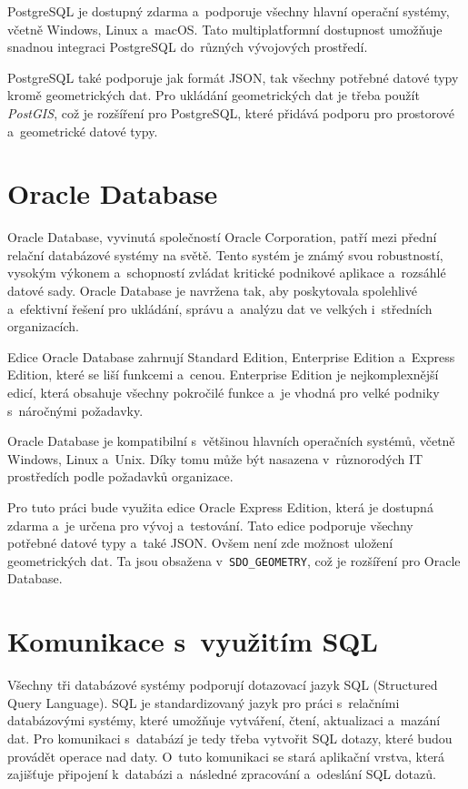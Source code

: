 PostgreSQL je dostupný zdarma a~podporuje všechny hlavní operační systémy, včetně Windows, Linux a~macOS.
Tato multiplatformní dostupnost umožňuje snadnou integraci PostgreSQL do~různých vývojových prostředí.
\cite{postgresql}

PostgreSQL také podporuje jak formát JSON, tak všechny potřebné datové typy kromě geometrických dat.
Pro ukládání geometrických dat je třeba použít \textit{PostGIS}, což je rozšíření pro PostgreSQL, které přidává
podporu pro prostorové a~geometrické datové typy.

\section{Oracle Database}
Oracle Database, vyvinutá společností Oracle Corporation, patří mezi přední relační
databázové systémy na světě. Tento systém je známý svou robustností, vysokým výkonem
a~schopností zvládat kritické podnikové aplikace a~rozsáhlé datové sady. Oracle Database
je navržena tak, aby poskytovala spolehlivé a~efektivní řešení pro ukládání, správu
a~analýzu dat ve velkých i~středních organizacích.

Edice Oracle Database zahrnují Standard Edition, Enterprise Edition a~Express Edition,
které se liší funkcemi a~cenou. Enterprise Edition je nejkomplexnější edicí, která
obsahuje všechny pokročilé funkce a~je vhodná pro velké podniky s~náročnými požadavky.

Oracle Database je kompatibilní s~většinou hlavních operačních systémů, včetně Windows,
Linux a~Unix. Díky tomu může být nasazena v~různorodých IT prostředích podle požadavků organizace.
\cite{oracle_database}

Pro tuto práci bude využita edice Oracle Express Edition, která je dostupná zdarma a~je určena pro vývoj a~testování.
Tato edice podporuje všechny potřebné datové typy a~také JSON. Ovšem není zde možnost 
uložení geometrických dat. Ta jsou obsažena v~\texttt{SDO\_GEOMETRY}, což je rozšíření pro Oracle Database.

\section{Komunikace s~využitím SQL}
Všechny tři databázové systémy podporují dotazovací jazyk SQL (Structured Query Language).
SQL je standardizovaný jazyk pro práci s~relačními databázovými systémy, které umožňuje vytváření, čtení, aktualizaci a~mazání dat.
Pro komunikaci s~databází je tedy třeba vytvořit SQL dotazy, které budou provádět operace nad daty.
O~tuto komunikaci se stará aplikační vrstva, která zajišťuje připojení k~databázi a~následné zpracování a~odeslání SQL dotazů.

